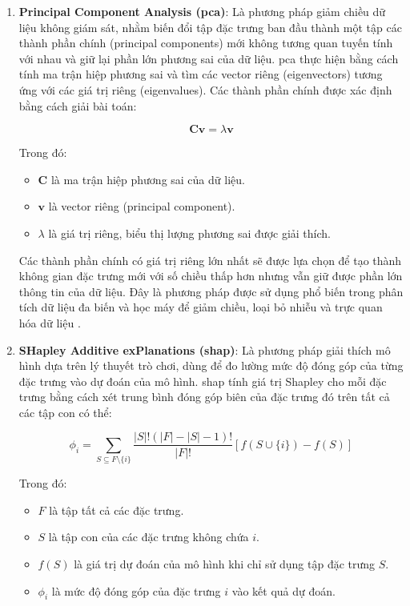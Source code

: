 \begin{enumerate}[label=\alph*)]
    \item \textbf{Principal Component Analysis (\ac{pca})}: Là phương pháp giảm chiều dữ liệu không giám sát, nhằm biến đổi tập đặc trưng ban đầu thành một tập các thành phần chính (principal components) mới không tương quan tuyến tính với nhau và giữ lại phần lớn phương sai của dữ liệu. \ac{pca} thực hiện bằng cách tính ma trận hiệp phương sai và tìm các vector riêng (eigenvectors) tương ứng với các giá trị riêng (eigenvalues). Các thành phần chính được xác định bằng cách giải bài toán:

    \begin{equation}
    \mathbf{C}\mathbf{v} = \lambda \mathbf{v}
    \end{equation}

    Trong đó:
    \begin{itemize}
        \item $\mathbf{C}$ là ma trận hiệp phương sai của dữ liệu.
        \item $\mathbf{v}$ là vector riêng (principal component).
        \item $\lambda$ là giá trị riêng, biểu thị lượng phương sai được giải thích.
    \end{itemize}

    Các thành phần chính có giá trị riêng lớn nhất sẽ được lựa chọn để tạo thành không gian đặc trưng mới với số chiều thấp hơn nhưng vẫn giữ được phần lớn thông tin của dữ liệu. Đây là phương pháp được sử dụng phổ biến trong phân tích dữ liệu đa biến và học máy để giảm chiều, loại bỏ nhiễu và trực quan hóa dữ liệu \cite{jolliffe2002pca}.

    \item \textbf{SHapley Additive exPlanations (\ac{shap})}: Là phương pháp giải thích mô hình dựa trên lý thuyết trò chơi, dùng để đo lường mức độ đóng góp của từng đặc trưng vào dự đoán của mô hình. \ac{shap} tính giá trị Shapley cho mỗi đặc trưng bằng cách xét trung bình đóng góp biên của đặc trưng đó trên tất cả các tập con có thể:

    \begin{equation}
    \phi_i = \sum_{S \subseteq F \setminus \{i\}} 
    \frac{|S|!(|F|-|S|-1)!}{|F|!} 
    \left[ f(S \cup \{i\}) - f(S) \right]
    \end{equation}

    Trong đó:
    \begin{itemize}
        \item $F$ là tập tất cả các đặc trưng.
        \item $S$ là tập con của các đặc trưng không chứa $i$.
        \item $f(S)$ là giá trị dự đoán của mô hình khi chỉ sử dụng tập đặc trưng $S$.
        \item $\phi_i$ là mức độ đóng góp của đặc trưng $i$ vào kết quả dự đoán.
    \end{itemize}


\end{enumerate}
